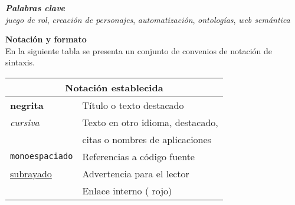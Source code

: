 {\large \textbf{\textit{Palabras clave}}} 
\vspace{0.5cm} \\
\textit{juego de rol}, \textit{creación de personajes}, \textit{automatización},
\textit{ontologías}, \textit{web semántica}
\blankpage{}

%
%
%
%

\blankpage{}

\thispagestyle{prefacepage}
{\large \textbf{Notación y formato}} \smallskip 
\vspace{0.5cm}\\
En la siguiente tabla se presenta un conjunto de convenios de notación de sintaxis.\smallskip 
\vspace{0.5cm}
\begin{center}
    \begin{tabular}{|l|l|} \hline
        \multicolumn{2}{|c|}{Notación establecida} \\ \hline
        \textbf{negrita} & Título o texto destacado \\ \hline
        \textit{cursiva} & Texto en otro idioma, destacado, \\ & citas o nombres de aplicaciones \\ \hline
        \texttt{monoespaciado} & Referencias a código fuente \\ \hline
        \underline{subrayado} & Advertencia para el lector \\ \hline
        {\color{Red}{color}} &  Enlace interno ({\color{Red} rojo}) \\ \hline
    \end{tabular}
\end{center}


\blankpage{}



